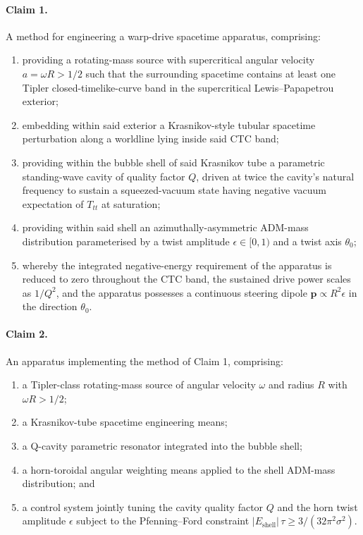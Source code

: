 \documentclass[11pt,a4paper]{article}
\begin{document}
\paragraph{Claim 1.} A method for engineering a warp-drive spacetime apparatus, comprising:
\begin{enumerate}[label=(\alph*),leftmargin=2em]
\item providing a rotating-mass source with supercritical angular velocity $a = \omega R > 1/2$ such that the surrounding spacetime contains at least one Tipler closed-timelike-curve band in the supercritical Lewis--Papapetrou exterior;
\item embedding within said exterior a Krasnikov-style tubular spacetime perturbation along a worldline lying inside said CTC band;
\item providing within the bubble shell of said Krasnikov tube a parametric standing-wave cavity of quality factor $Q$, driven at twice the cavity's natural frequency to sustain a squeezed-vacuum state having negative vacuum expectation of $T_{tt}$ at saturation;
\item providing within said shell an azimuthally-asymmetric ADM-mass distribution parameterised by a twist amplitude $\epsilon \in [0, 1)$ and a twist axis $\theta_0$;
\item whereby the integrated negative-energy requirement of the apparatus is reduced to zero throughout the CTC band, the sustained drive power scales as $1/Q^2$, and the apparatus possesses a continuous steering dipole $\bm{p} \propto R^2 \epsilon$ in the direction $\theta_0$.
\end{enumerate}

\paragraph{Claim 2.} An apparatus implementing the method of Claim 1, comprising:
\begin{enumerate}[label=(\alph*),leftmargin=2em]
\item a Tipler-class rotating-mass source of angular velocity $\omega$ and radius $R$ with $\omega R > 1/2$;
\item a Krasnikov-tube spacetime engineering means;
\item a Q-cavity parametric resonator integrated into the bubble shell;
\item a horn-toroidal angular weighting means applied to the shell ADM-mass distribution; and
\item a control system jointly tuning the cavity quality factor $Q$ and the horn twist amplitude $\epsilon$ subject to the Pfenning--Ford constraint $|E_{\mathrm{shell}}|\,\tau \ge 3/(32\pi^2 \sigma^2)$.
\end{enumerate}
\end{document}

